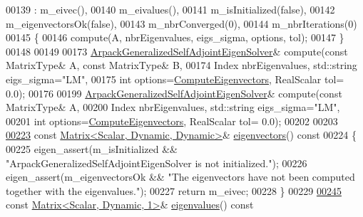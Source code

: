 \begin{DoxyCode}
00139     : m\_eivec(),
00140       m\_eivalues(),
00141       m\_isInitialized(false),
00142       m\_eigenvectorsOk(false),
00143       m\_nbrConverged(0),
00144       m\_nbrIterations(0)
00145   \{
00146     compute(A, nbrEigenvalues, eigs\_sigma, options, tol);
00147   \}
00148 
00149 
00173   \hyperlink{class_eigen_1_1_arpack_generalized_self_adjoint_eigen_solver}{ArpackGeneralizedSelfAdjointEigenSolver}& compute(\textcolor{keyword}{const} MatrixType&
       A, \textcolor{keyword}{const} MatrixType& B,
00174                                                    Index nbrEigenvalues, std::string eigs\_sigma=\textcolor{stringliteral}{"LM"},
00175                                         \textcolor{keywordtype}{int} options=\hyperlink{group__enums_ggae3e239fb70022eb8747994cf5d68b4a9ada93d8885bde32b876ba4af01d3292cc}{ComputeEigenvectors}, RealScalar tol=
      0.0);
00176   
00199   \hyperlink{class_eigen_1_1_arpack_generalized_self_adjoint_eigen_solver}{ArpackGeneralizedSelfAdjointEigenSolver}& compute(\textcolor{keyword}{const} MatrixType&
       A,
00200                                                    Index nbrEigenvalues, std::string eigs\_sigma=\textcolor{stringliteral}{"LM"},
00201                                         \textcolor{keywordtype}{int} options=\hyperlink{group__enums_ggae3e239fb70022eb8747994cf5d68b4a9ada93d8885bde32b876ba4af01d3292cc}{ComputeEigenvectors}, RealScalar tol=
      0.0);
00202 
00203 
\hyperlink{class_eigen_1_1_arpack_generalized_self_adjoint_eigen_solver_a183825135568364792a955efc55a0773}{00223}   \textcolor{keyword}{const} \hyperlink{group___core___module}{Matrix<Scalar, Dynamic, Dynamic>}& 
      \hyperlink{class_eigen_1_1_arpack_generalized_self_adjoint_eigen_solver_a183825135568364792a955efc55a0773}{eigenvectors}()\textcolor{keyword}{ const}
00224 \textcolor{keyword}{  }\{
00225     eigen\_assert(m\_isInitialized && \textcolor{stringliteral}{"ArpackGeneralizedSelfAdjointEigenSolver is not initialized."});
00226     eigen\_assert(m\_eigenvectorsOk && \textcolor{stringliteral}{"The eigenvectors have not been computed together with the
       eigenvalues."});
00227     \textcolor{keywordflow}{return} m\_eivec;
00228   \}
00229 
\hyperlink{class_eigen_1_1_arpack_generalized_self_adjoint_eigen_solver_ab46900dafdd11a8ac05a662c6b41480d}{00245}   \textcolor{keyword}{const} \hyperlink{group___core___module}{Matrix<Scalar, Dynamic, 1>}& \hyperlink{class_eigen_1_1_arpack_generalized_self_adjoint_eigen_solver_ab46900dafdd11a8ac05a662c6b41480d}{eigenvalues}()\textcolor{keyword}{ const}

\end{DoxyCode}
